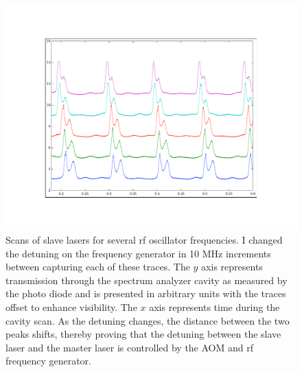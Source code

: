  
\begin{figure}
    \centerline{\includegraphics{sampleOffsetData}}
    \caption[Scans of slave lasers for several rf oscillator frequencies]{\label{fig:typicaldata}
Scans of slave lasers for several rf oscillator frequencies. I changed the detuning on the frequency generator in 10 MHz increments between capturing each of these traces. The $y$ axis represents transmission through the spectrum analyzer cavity as measured by the photo diode and is presented in arbitrary units with the traces offset to enhance visibility. The $x$ axis represents time during the cavity scan. As the detuning changes, the distance between the two peaks shifts, thereby proving that the detuning between the slave laser and the master laser is controlled by the AOM and rf frequency generator.}
\end{figure}



